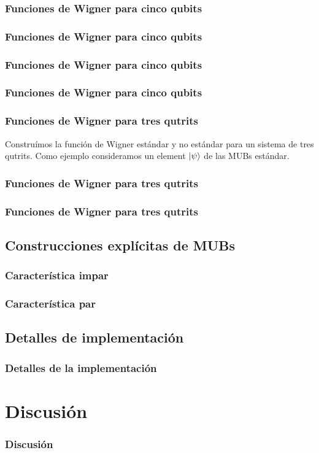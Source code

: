 \documentclass[10pt]{beamer}
\begin{document}
  \begin{frame}
    \frametitle{Funciones de Wigner para cinco qubits}
  \end{frame}

  \begin{frame}
    \frametitle{Funciones de Wigner para cinco qubits}
  \end{frame}

  \begin{frame}
    \frametitle{Funciones de Wigner para cinco qubits}
  \end{frame}

  \begin{frame}
    \frametitle{Funciones de Wigner para cinco qubits}
  \end{frame}

  \begin{frame}
    \frametitle{Funciones de Wigner para tres qutrits}

    Construímos la función de Wigner estándar y no estándar
    para un sistema de tres qutrits. Como ejemplo
    consideramos un element $\ket{\psi}$ de las MUBs
    estándar.
  \end{frame}

  \begin{frame}
    \frametitle{Funciones de Wigner para tres qutrits}
  \end{frame}

  \begin{frame}
    \frametitle{Funciones de Wigner para tres qutrits}
  \end{frame}

  \subsection{Construcciones explícitas de MUBs}

  \begin{frame}
    \frametitle{Característica impar}
  \end{frame}

  \begin{frame}
    \frametitle{Característica par}
  \end{frame}

  \subsection{Detalles de implementación}

  \begin{frame}
    \frametitle{Detalles de la implementación}
  \end{frame}

  \section{Discusión}

  \begin{frame}
    \frametitle{Discusión}
  \end{frame}
\end{document}
